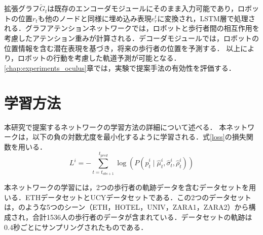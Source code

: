 拡張グラフ$\tilde{G}_t$は既存のエンコーダモジュールにそのまま入力可能であり，ロボットの位置$r_t$も他のノードと同様に埋め込み表現$e^t_r$に変換され，LSTM層で処理される．グラフアテンションネットワークでは，ロボットと歩行者間の相互作用を考慮したアテンション重みが計算される．デコーダモジュールでは，ロボットの位置情報を含む潜在表現を基づき，将来の歩行者の位置を予測する．
以上により，ロボットの行動を考慮した軌道予測が可能となる．\ref{chap:experiments_oculus}章では，実験で提案手法の有効性を評価する．

\vspace{-5pt}
\section{学習方法}\label{sec:learning-method}
本研究で提案するネットワークの学習方法の詳細について述べる．
本ネットワークは，以下の負の対数尤度を最小化するように学習される．式\eqref{loss}の損失関数を用いる．
\begin{equation}
  L^i = -\sum_{t=t_{obs+1}}^{t_{pred}} \log \left( P(\hat{p}^i_t \mid \hat{\mu}^i_t, \hat{\sigma}^i_t, \hat{\rho}^i_t) \right) \label{loss}
\end{equation}

本ネットワークの学習には，2つの歩行者の軌跡データを含むデータセットを用いる．ETHデータセット\cite{pellegrini2009you-eth}とUCYデータセット\cite{lerner2007crowds-ucy}である．この2つのデータセットは，のような5つのシーン（ETH，HOTEL，UNIV，ZARA1，ZARA2）から構成され，合計1536人の歩行者のデータが含まれている．データセットの軌跡は0.4秒ごとにサンプリングされたものである．

